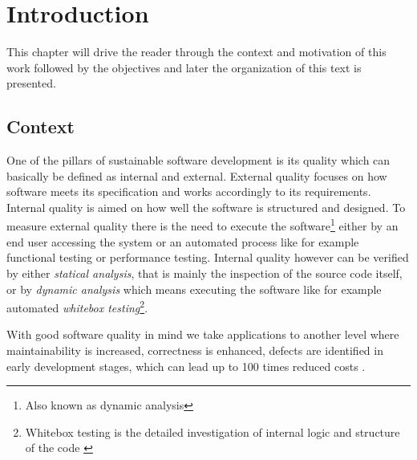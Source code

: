 \chapter{Introduction}
 This chapter will drive the reader through the context and motivation of this work followed by the objectives and later the organization of this text is presented.  
 

\section{Context}

One of the pillars of sustainable software development is its quality which can basically be defined as internal and external. External quality focuses on how software meets its specification and works accordingly to its requirements. Internal quality is aimed on how well the software is structured and designed. To measure external quality there is the need to execute the software\footnote{Also known as dynamic analysis} either by an end user accessing the system or an automated process like for example functional testing or performance testing. Internal quality however can be verified by either \emph{statical analysis}, that is mainly the inspection of the source code itself, or by \emph{dynamic analysis} which means executing the software like for example automated \emph{whitebox testing}\footnote{Whitebox testing is the detailed investigation of internal logic and structure of the code \citep{Khan 2012}}.   

With good software quality in mind we take applications to another level where maintainability is increased, correctness is enhanced, defects are identified in early development stages, which can lead up to 100 times reduced costs \citep{Beohm 2001}.

